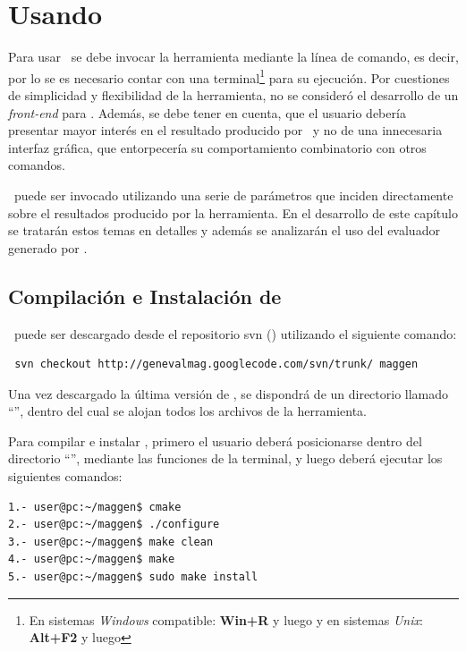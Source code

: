 \chapter{Usando \maggen}
\label{chap:usos}
\minitoc

Para usar \maggen\ se debe invocar la herramienta mediante la línea de comando, es decir, por lo se es necesario contar con una terminal\footnote{En sistemas \textit{Windows} compatible: \textbf{Win+R} y luego  y en sistemas \textit{Unix}: \textbf{Alt+F2} y luego } para su ejecución. Por cuestiones de simplicidad y flexibilidad de la herramienta, no se consideró el desarrollo de un \textit{front-end} para \maggen. Además, se debe tener en cuenta, que el usuario debería presentar mayor interés en el resultado producido por \maggen\ y no de una innecesaria interfaz gráfica, que entorpecería su comportamiento combinatorio con otros comandos.
  
\maggen\ puede ser invocado utilizando una serie de parámetros que inciden directamente sobre el resultados producido por la herramienta. En el desarrollo de este capítulo se tratarán estos temas en detalles y además se analizarán el uso del evaluador generado por \maggen.

\section{Compilación e Instalación de \maggen}
\maggen\ puede ser descargado desde el repositorio svn (\cite{svn-book}) utilizando el siguiente comando:
\begin{verbatim}
 svn checkout http://genevalmag.googlecode.com/svn/trunk/ maggen
\end{verbatim}

Una vez descargado la última versión de \maggen, se dispondrá de un directorio llamado ``'', dentro del cual se alojan todos los archivos de la herramienta.

Para compilar e instalar \maggen, primero el usuario deberá posicionarse dentro del directorio ``'', mediante las funciones de la terminal, y luego deberá ejecutar los siguientes comandos:
{\small\begin{verbatim}
1.- user@pc:~/maggen$ cmake
2.- user@pc:~/maggen$ ./configure
3.- user@pc:~/maggen$ make clean
4.- user@pc:~/maggen$ make
5.- user@pc:~/maggen$ sudo make install
\end{verbatim}}

